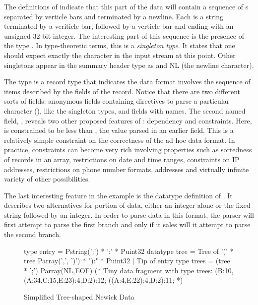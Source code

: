 \documentclass[11pt]{article}
\begin{document}
The definitions of  indicate that
this part of the \dibbler{} data will contain a sequence
of s separated by verticle bars and terminated by a newline.
Each  is a string terminated by a veriticle bar,
followed by a verticle bar and ending with an unsigned
32-bit integer.  The interesting part of this sequence is the
presence of the type .  In type-theoretic terms, this is
a {\em singleton type}.  It states that one should
 expect exactly the character  in the input stream at this point.
Other singletons appear in the summary header type as 
and NL (the newline character).

The type  is a record type that indicates
the data format involves the sequence of items described by
the fields of the record.  Notice that there are two different
sorts of fields: anonymous fields containing directives to parse
a particular character (), like the singleton types,
and fields with names.  The second named field,
, reveals two other proposed features of 
\datatype: dependency and constraints.  Here,
 is constrained to be less than
, the value parsed in an earlier field.
This is a relatively simple constraint on the correctness of the
ad hoc data format.  In practice, constraints can become very rich
involving properties such as sortedness of records in an array,
restrictions on date and time ranges, constraints on IP addresses,
restrictions on phone number formats, addresses and virtually 
infinite variety of other possibilities. 

The last interesting feature in the \dibbler{} example is the
datatype definition of .  It describes
two alternatives for portion of data, either an integer alone
or the fixed string  followed by an integer.
In order to parse data in this format, the parser will
first attempt to parse the first branch and only if it
sales will it attempt to parse the second branch.

\begin{figure}
\begin{code}
type entry = Pstring(':') * ':' * Puint32
\mbox{}
datatype tree =
    Tree of '(' * tree Parray(',', ')') * "):" * Puint32
  | Tip of entry
\mbox{}
type trees = (tree * ';') Parray(NL,EOF)
\mbox{}
(* Tiny data fragment with type trees:
\mbox{}
(B:10,(A:34,C:15,E:23):4,D:2):12;
((A:4,E:22):4,D:2):11;
\mbox{}
*)
\end{code}
\caption{Simplified Tree-shaped Newick Data}
\label{figure:newick}
\end{figure}
\end{document}
